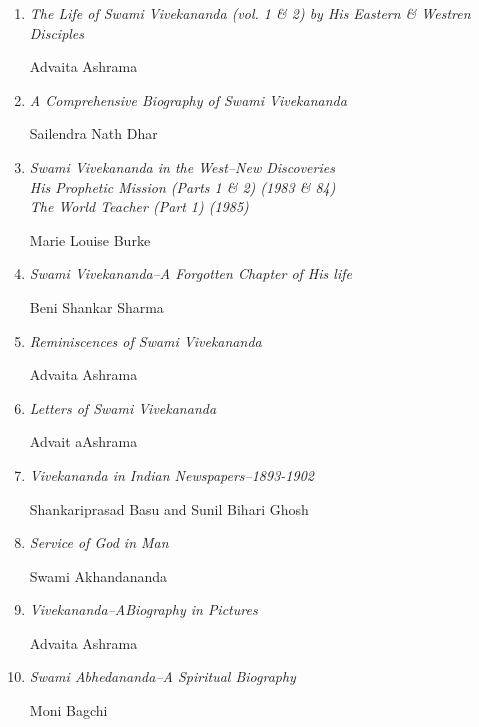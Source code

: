 \begin{enumerate}
\item \textit{The Life of Swami Vivekananda (vol. 1 \& 2) by His Eastern \& Westren Disciples}
\begin{flushright}
Advaita Ashrama
\end{flushright}

 \item \textit{A Comprehensive Biography of Swami Vivekananda }
\begin{flushright}
Sailendra Nath Dhar
\end{flushright}

 \item \textit{Swami Vivekananda in the West–New Discoveries\\His Prophetic Mission (Parts 1 \& 2) (1983 \& 84)\\The World Teacher (Part 1) (1985) }
\begin{flushright}
Marie Louise Burke
\end{flushright}

 \item \textit{Swami Vivekananda–A Forgotten Chapter of His life}
\begin{flushright}
Beni Shankar Sharma
\end{flushright}

 \item \textit{Reminiscences of Swami Vivekananda }
\begin{flushright}
Advaita Ashrama
\end{flushright}

 \item \textit{Letters of Swami Vivekananda }
\begin{flushright}
Advait aAshrama
\end{flushright}

 \item \textit{Vivekananda in Indian Newspapers–1893-1902 }
\begin{flushright}
Shankariprasad Basu and Sunil Bihari Ghosh
\end{flushright}

 \item \textit{Service of God in Man }
\begin{flushright}
Swami Akhandananda
\end{flushright}

 \item \textit{Vivekananda–ABiography in Pictures }
\begin{flushright}
Advaita Ashrama
\end{flushright}

 \item \textit{Swami Abhedananda–A Spiritual Biography }
\begin{flushright}
Moni Bagchi
\end{flushright}

\end{enumerate}

